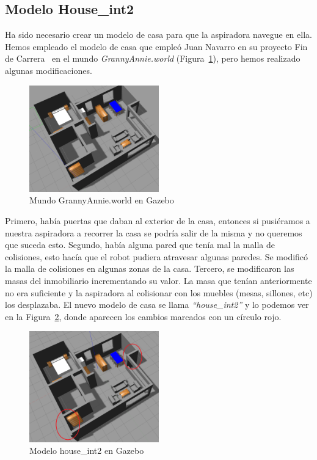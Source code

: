 \subsection{Modelo House\_int2}
Ha sido necesario crear un modelo de casa para que la aspiradora navegue en ella. Hemos empleado el modelo de casa que empleó Juan Navarro en su proyecto Fin de Carrera~\cite{localization1} en el mundo \textit{GrannyAnnie.world} (Figura~\ref{fig.modelocasa_antiguo}), pero hemos realizado algunas modificaciones.\\

\begin{figure}[H]
  \begin{center}
    \includegraphics[width=0.5\textwidth]{figures/Vacuum/ModeloCasa_antiguo.png}
		\caption{Mundo GrannyAnnie.world en Gazebo}
		\label{fig.modelocasa_antiguo}
		\end{center}
\end{figure}

Primero, había puertas que daban al exterior de la casa, entonces si pusiéramos a nuestra aspiradora a recorrer la casa se podría salir de la misma y no queremos que suceda esto. Segundo, había alguna pared que tenía mal la malla de colisiones, esto hacía que el robot pudiera atravesar algunas paredes. Se modificó la malla de colisiones en algunas zonas de la casa. Tercero, se modificaron las masas del inmobiliario incrementando su valor. La masa que tenían anteriormente no era suficiente y la aspiradora al colisionar con los muebles (mesas, sillones, etc) los desplazaba. El nuevo modelo de casa se llama \textit{``house\_int2''} y lo podemos ver en la Figura~\ref{fig.casa}, donde aparecen los cambios marcados con un círculo rojo.\\

\begin{figure}[H]
  \begin{center}
    \includegraphics[width=0.5\textwidth]{figures/Vacuum/casa.png}
		\caption{Modelo house\_int2 en Gazebo}
		\label{fig.casa}
		\end{center}
\end{figure}

